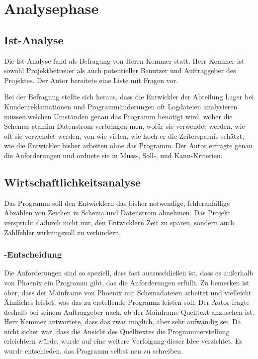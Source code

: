\section{Analysephase} 
\label{sec:Analysephase}

\subsection{Ist-Analyse} 
\label{sec:IstAnalyse}
Die Ist-Analyse fand als Befragung von Herrn Kemmer statt. Herr Kemmer ist sowohl Projektbetreuer als auch potentieller Benutzer und Auftraggeber des Projektes. Der Autor bereitete eine Liste mit Fragen vor.

Bei der Befragung stellte sich heraus, dass die Entwickler der Abteilung Lager bei Kundenreklamationen und Programmänderungen oft Logdateien analysieren müssen.welchen Umständen genau das Programm benötigt wird, woher die Schemas stamim Datenstrom verbringen men, wofür sie verwendet werden, wie oft sie verwendet werden, von wie vielen, wie hoch er die Zeitersparnis schätzt, wie die Entwickler bisher arbeiten ohne das Programm. Der Autor erfragte genau die Anforderungen und ordnete sie in Muss-, Soll-, und Kann-Kriterien.


\subsection{Wirtschaftlichkeitsanalyse}
\label{sec:Wirtschaftlichkeitsanalyse}
Das Programm soll den Entwicklern das bisher notwendige, fehleranfällige Abzählen von Zeichen in Schema und Datenstrom abnehmen. Das Projekt verspricht dadurch nicht nur, den Entwicklern Zeit zu sparen, sondern auch Zählfehler wirkungsvoll zu verhindern.

\subsubsection{-Entscheidung}
\label{sec:MakeOrBuyEntscheidung}
Die Anforderungen sind so speziell, dass fast auszuschließen ist, dass es außerhalb von Phoenix ein Programm gibt, das die Anforderungen erfüllt. Zu bemerken ist aber, dass der Mainframe von Phoenix mit Schemadateien arbeitet und vielleicht Ähnliches leistet, was das zu erstellende Programm leisten soll. Der Autor fragte deshalb bei seinem Auftraggeber nach, ob der Mainframe-Quelltext anzusehen ist. Herr Kemmer antwortete, dass das zwar möglich, aber sehr aufwändig sei. Da nicht sicher war, dass die Ansicht des Quelltextes die Programmerstellung erleichtern würde, wurde auf eine weitere Verfolgung dieser Idee verzichtet. Es wurde entschieden, das Programm selbst neu zu schreiben.

